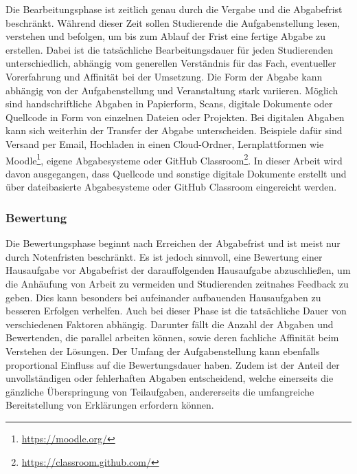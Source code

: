 Die Bearbeitungsphase ist zeitlich genau durch die Vergabe und die Abgabefrist beschränkt.
Während dieser Zeit sollen Studierende die Aufgabenstellung lesen, verstehen und befolgen, um bis zum Ablauf der Frist eine fertige Abgabe zu erstellen.
Dabei ist die tatsächliche Bearbeitungsdauer für jeden Studierenden unterschiedlich, abhängig vom generellen Verständnis für das Fach, eventueller Vorerfahrung und Affinität bei der Umsetzung.
Die Form der Abgabe kann abhängig von der Aufgabenstellung und Veranstaltung stark variieren.
Möglich sind handschriftliche Abgaben in Papierform, Scans, digitale Dokumente oder Quellcode in Form von einzelnen Dateien oder Projekten.
Bei digitalen Abgaben kann sich weiterhin der Transfer der Abgabe unterscheiden.
Beispiele dafür sind Versand per Email, Hochladen in einen Cloud-Ordner, Lernplattformen wie Moodle\footnote{\url{https://moodle.org/}}, eigene Abgabesysteme oder GitHub Classroom\footnote{\url{https://classroom.github.com/}}.
In dieser Arbeit wird davon ausgegangen, dass Quellcode und sonstige digitale Dokumente erstellt und über dateibasierte Abgabesysteme oder GitHub Classroom eingereicht werden.

\subsubsection{Bewertung}

Die Bewertungsphase beginnt nach Erreichen der Abgabefrist und ist meist nur durch Notenfristen beschränkt.
Es ist jedoch sinnvoll, eine Bewertung einer Hausaufgabe vor Abgabefrist der darauffolgenden Hausaufgabe abzuschließen, um die Anhäufung von Arbeit zu vermeiden und Studierenden zeitnahes Feedback zu geben.
Dies kann besonders bei aufeinander aufbauenden Hausaufgaben zu besseren Erfolgen verhelfen.
Auch bei dieser Phase ist die tatsächliche Dauer von verschiedenen Faktoren abhängig.
Darunter fällt die Anzahl der Abgaben und Bewertenden, die parallel arbeiten können, sowie deren fachliche Affinität beim Verstehen der Lösungen.
Der Umfang der Aufgabenstellung kann ebenfalls proportional Einfluss auf die Bewertungsdauer haben.
Zudem ist der Anteil der unvollständigen oder fehlerhaften Abgaben entscheidend, welche einerseits die gänzliche Überspringung von Teilaufgaben, andererseits die umfangreiche Bereitstellung von Erklärungen erfordern können.


